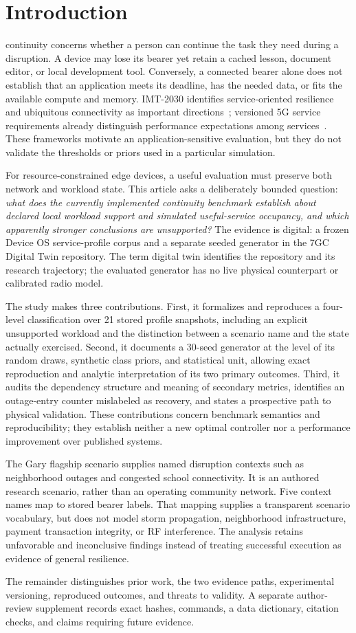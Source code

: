 \section{Introduction}
\label{sec:intro}
 continuity concerns whether a person can continue the task they need during a disruption. A device may lose its bearer yet retain a cached lesson, document editor, or local development tool. Conversely, a connected bearer alone does not establish that an application meets its deadline, has the needed data, or fits the available compute and memory. IMT-2030 identifies service-oriented resilience and ubiquitous connectivity as important directions~\cite{itur_m2160}; versioned 5G service requirements already distinguish performance expectations among services~\cite{3gpp_ts22261}. These frameworks motivate an application-sensitive evaluation, but they do not validate the thresholds or priors used in a particular simulation.

For resource-constrained edge devices, a useful evaluation must preserve both network and workload state. This article asks a deliberately bounded question: \emph{what does the currently implemented continuity benchmark establish about declared local workload support and simulated useful-service occupancy, and which apparently stronger conclusions are unsupported?} The evidence is digital: a frozen Device OS service-profile corpus and a separate seeded generator in the 7GC Digital Twin repository. The term digital twin identifies the repository and its research trajectory; the evaluated generator has no live physical counterpart or calibrated radio model.

The study makes three contributions. First, it formalizes and reproduces a four-level classification over 21 stored profile snapshots, including an explicit unsupported workload and the distinction between a scenario name and the state actually exercised. Second, it documents a 30-seed generator at the level of its random draws, synthetic class priors, and statistical unit, allowing exact reproduction and analytic interpretation of its two primary outcomes. Third, it audits the dependency structure and meaning of secondary metrics, identifies an outage-entry counter mislabeled as recovery, and states a prospective path to physical validation. These contributions concern benchmark semantics and reproducibility; they establish neither a new optimal controller nor a performance improvement over published systems.

The Gary flagship scenario supplies named disruption contexts such as neighborhood outages and congested school connectivity. It is an authored research scenario, rather than an operating community network. Five context names map to stored bearer labels. That mapping supplies a transparent scenario vocabulary, but does not model storm propagation, neighborhood infrastructure, payment transaction integrity, or RF interference. The analysis retains unfavorable and inconclusive findings instead of treating successful execution as evidence of general resilience.

The remainder distinguishes prior work, the two evidence paths, experimental versioning, reproduced outcomes, and threats to validity. A separate author-review supplement records exact hashes, commands, a data dictionary, citation checks, and claims requiring future evidence.
